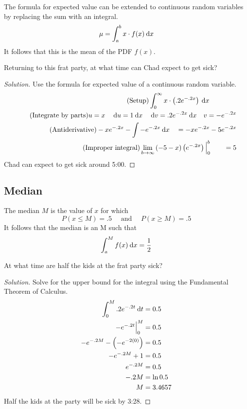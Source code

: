 \documentclass[11pt,leqno,letterpaper]{article}
\begin{document}
The formula for expected value can be extended to continuous
random variables by replacing the sum with an integral.
\[
\mu = \int_a^b x\cdot f(x)\:\mathrm{d}x
\]
It follows that this is the mean of the PDF $f(x)$.
\begin{mdframed}
\begin{problem}
Returning to this frat party,
at what time can Chad expect to get sick?
\begin{proof}[Solution]
Use the formula for expected value of a continuous random variable.
\begin{align*}
\tag{Setup}
\int_0^\infty x\cdot \left(.2e^{-.2x}\right)\:\mathrm{d}x \qquad \qquad \\
\tag{Integrate by parts}
u=x \quad \:\mathrm{d}u = 1\:\mathrm{d}x \quad \:\mathrm{d}v = .2e^{-.2x}\:\mathrm{d}x \quad v = -e^{-.2x} \\
\tag{Antiderivative}
-xe^{-.2x} - \int -e^{-.2x}\:\mathrm{d}x \quad = -xe^{-.2x} -5e^{-.2x} \\
\tag{Improper integral}
\lim_{b\to \infty}\left(-5-x\right)\left(e^{-.2x}\right)\Big|_0^b
\qquad = 5
\end{align*}
Chad can expect to get sick around 5:00\AM{}.
\end{proof}
\end{problem}
\end{mdframed}
\subsection{Median}
The median $M$ is the value of $x$ for which
\[
P(x\leq M) = .5 \quad \text{ and } \quad P(x\geq M) = .5
\]
It follows that the median is an M such that
\[
\int_a^M f(x) \:\mathrm{d}x = \frac{1}{2}
\]
\begin{mdframed}
\begin{problem}
At what time are half the kids at the frat party sick?
\begin{proof}[Solution]
Solve for the upper bound for the integral using
the Fundamental Theorem of Calculus.
\begin{align*}
\int_0^M .2e^{-.2t}\:\mathrm{d}t &= 0.5 \\
-e^{-.2t}\Big|_0^M &= 0.5 \\
-e^{-.2M}-\left(-e^{-2(0)}\right) &= 0.5 \\
-e^{-.2M} +1 &= 0.5 \\
e^{-.2M} &= 0.5 \\
-.2M &= \ln 0.5 \\
M &= 3.4657
\end{align*}
Half the kids at the party will be sick by 3:28\AM{}.
\end{proof}
\end{problem}
\end{mdframed}
\end{document}
